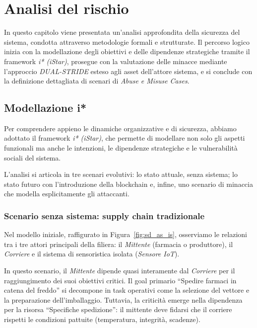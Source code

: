 \chapter{Analisi del rischio}

\begin{preamble}
In questo capitolo viene presentata un'analisi approfondita della sicurezza del sistema, condotta attraverso metodologie formali e strutturate. Il percorso logico inizia con la modellazione degli obiettivi e delle dipendenze strategiche tramite il framework \textit{i* (iStar)}, prosegue con la valutazione delle minacce mediante l'approccio \textit{DUAL-STRIDE} esteso agli asset dell'attore sistema, e si conclude con la definizione dettagliata di scenari di \textit{Abuse e Misuse Cases}.
\end{preamble}

\section{Modellazione i*}
Per comprendere appieno le dinamiche organizzative e di sicurezza, abbiamo adottato il framework \textit{i* (iStar)}, che permette di modellare non solo gli aspetti funzionali ma anche le intenzioni, le dipendenze strategiche e le vulnerabilità sociali del sistema.

L'analisi si articola in tre scenari evolutivi: lo stato attuale, senza sistema; lo stato futuro con l'introduzione della blockchain e, infine, uno scenario di minaccia che modella esplicitamente gli attaccanti.

\subsection{Scenario senza sistema: supply chain tradizionale}
Nel modello iniziale, raffigurato in Figura~\ref{fig:sd_as_is}, osserviamo le relazioni tra i tre attori principali della filiera: il \textit{Mittente} (farmacia o produttore), il \textit{Corriere} e il sistema di sensoristica isolata (\textit{Sensore IoT}).

In questo scenario, il \textit{Mittente} dipende quasi interamente dal \textit{Corriere} per il raggiungimento dei suoi obiettivi critici. Il goal primario ``Spedire farmaci in catena del freddo'' si decompone in task operativi come la selezione del vettore e la preparazione dell'imballaggio. Tuttavia, la criticità emerge nella dipendenza per la risorsa ``Specifiche spedizione'': il mittente deve fidarsi che il corriere rispetti le condizioni pattuite (temperatura, integrità, scadenze).

